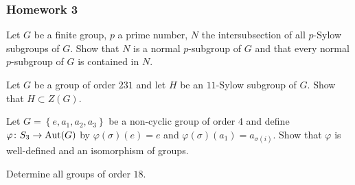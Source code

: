 \subsubsection{Homework 3}
\begin{problem}
  Let $G$ be a finite group, $p$ a prime number, $N$ the intersubsection of
  all $p$-Sylow subgroups of $G$. Show that $N$ is a normal $p$-subgroup of
  $G$ and that every normal $p$-subgroup of $G$ is contained in $N$.
\end{problem}
\begin{solution}
\end{solution}

\begin{problem}
  Let $G$ be a group of order $231$ and let $H$ be an $11$-Sylow subgroup
  of $G$. Show that $H\subset Z(G)$.
\end{problem}
\begin{solution}
\end{solution}

\begin{problem}
  Let $G=\left\{e,a_1,a_2,a_3\right\}$ be a non-cyclic group of order $4$
  and define $\varphi\colon S_3\to\operatorname{Aut}(G)$ by $\varphi(\sigma)(e)=e$ and
  $\varphi(\sigma)(a_1)=a_{\sigma(i)}$. Show that $\varphi$ is well-defined
  and an isomorphism of groups.
\end{problem}
\begin{solution}
\end{solution}

\begin{problem}
  Determine all groups of order $18$.
\end{problem}
\begin{solution}
\end{solution}

